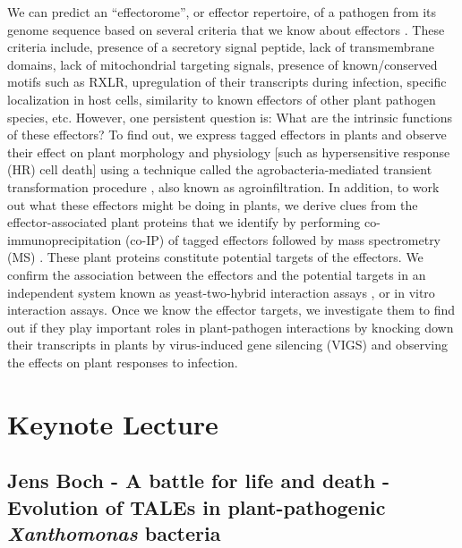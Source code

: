 \documentclass[12pt,]{book}
\theoremstyle{definition}
\theoremstyle{definition}
\theoremstyle{remark}
\begin{document}
We can predict an ``effectorome'', or effector repertoire, of a pathogen
from its genome sequence based on several criteria that we know about
effectors \citep{Saunders:2012bw}. These criteria include, presence of a
secretory signal peptide, lack of transmembrane domains, lack of
mitochondrial targeting signals, presence of known/conserved motifs such
as RXLR, upregulation of their transcripts during infection, specific
localization in host cells, similarity to known effectors of other plant
pathogen species, etc. However, one persistent question is: What are the
intrinsic functions of these effectors? To find out, we express tagged
effectors in plants and observe their effect on plant morphology and
physiology {[}such as hypersensitive response (HR) cell death{]} using a
technique called the agrobacteria-mediated transient transformation
procedure \citep{Kapila:1997}, also known as agroinfiltration. In
addition, to work out what these effectors might be doing in plants, we
derive clues from the effector-associated plant proteins that we
identify by performing co-immunoprecipitation (co-IP) of tagged
effectors followed by mass spectrometry (MS) \citep{Win:2011dw}. These
plant proteins constitute potential targets of the effectors. We confirm
the association between the effectors and the potential targets in an
independent system known as yeast-two-hybrid interaction assays
\citep{Fields:1989dm}, or in vitro interaction assays. Once we know the
effector targets, we investigate them to find out if they play important
roles in plant-pathogen interactions by knocking down their transcripts
in plants by virus-induced gene silencing (VIGS) \citep{Lindbo:1993kp}
and observing the effects on plant responses to infection.

\pagebreak

\section*{Keynote Lecture}\label{keynote-lecture-2}

\subsection*{\texorpdfstring{Jens Boch - A battle for life and death -
Evolution of TALEs in plant-pathogenic \emph{Xanthomonas}
bacteria}{Jens Boch - A battle for life and death - Evolution of TALEs in plant-pathogenic Xanthomonas bacteria}}\label{jens-boch---a-battle-for-life-and-death---evolution-of-tales-in-plant-pathogenic-xanthomonas-bacteria}
\end{document}
